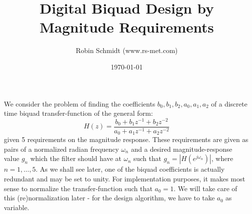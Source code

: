 \title{Digital Biquad Design by Magnitude Requirements}
\author{Robin Schmidt (www.rs-met.com)}
\date{\today}
\maketitle

We consider the problem of finding the coefficients $b_0, b_1, b_2, a_0, a_1, a_2$ of a discrete time biquad transfer-function of the general form:
\begin{equation}
\label{Eq:TransferFunctionBiquad}
 H(z) = \frac{b_0 + b_1 z^{-1} + b_2 z^{-2}}{a_0 + a_1 z^{-1} + a_2 z^{-2}}
\end{equation}
given 5 requirements on the magnitude response. These requirements are given as pairs of a normalized radian frequency $\omega_n$ and a desired magnitude-response value $g_n$ which the filter should have at $\omega_n$ such that $g_n = |H(e^{j \omega_n})|$, where $n = 1, \ldots, 5$. As we shall see later, one of the biquad coefficients is actually redundant and may be set to unity. For implementation purposes, it makes most sense to normalize the transfer-function such that $a_0 = 1$. We will take care of this (re)normalization later - for the design algorithm, we have to take $a_0$ as variable.

